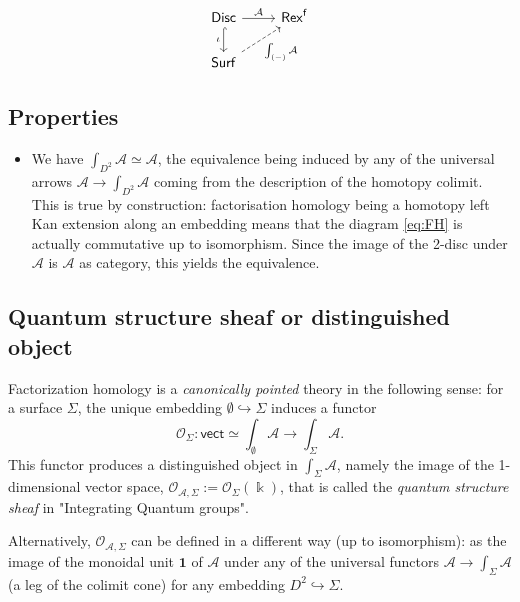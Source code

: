 \documentclass[11pt]{article}
\newcommand{\cat}[1]{\mathcal{#1}}
\newcommand{\Rexf}{\mathsf{Rex}^{\mathsf{f}}}
\newcommand{\cA}{\mathcal{A}}
\theoremstyle{definition}
\begin{document}
\begin{equation}\label{eq:FH}
\begin{tikzcd}
\mathsf{Disc} \rar{\cA} \arrow[hook]{d}[swap]{\iota} & \Rexf \\
\mathsf{Surf}  \arrow[dashed]{ur}[swap]{\int_{(-)} \cA}  &
\end{tikzcd}
\end{equation}


\subsection{Properties}


\begin{itemize}
    \item We have $\int_{D^2} \cA \simeq \cA$, the equivalence being induced by any of the universal arrows $\cA \to \int_{D^2} \cA $ coming from the description of the homotopy colimit. This is true by construction: factorisation homology being a homotopy left Kan extension along an embedding means that the diagram \eqref{eq:FH} is actually commutative up to isomorphism. Since the image of the 2-disc under $\cA$ is $\cA$ as category, this yields the equivalence.
\end{itemize}


\subsection{Quantum structure sheaf or distinguished object}

Factorization homology is a \emph{canonically pointed} theory in the following sense: for a surface $\Sigma$, the unique embedding $\emptyset \hookrightarrow \Sigma$ induces a functor $$ \cat{O}_\Sigma: \mathsf{vect} \simeq \int_{\emptyset} \cA \to \int_\Sigma \cA  .$$ This functor produces a distinguished object in $\int_\Sigma \cA$, namely the image of the 1-dimensional vector space, $\cat{O}_{\cA, \Sigma} := \cat{O}_\Sigma (\Bbbk)$, that is called the \emph{quantum structure sheaf} in "Integrating Quantum groups".

Alternatively, $\cat{O}_{\cA, \Sigma}$ can be defined in a different way (up to isomorphism):  as the image of the monoidal unit $\mathbf{1}$ of $\cA$ under any of the universal functors $\cA \to \int_\Sigma \cA$  (a leg of the colimit cone) for any embedding $D^2 \hookrightarrow \Sigma$. 
\end{document}
